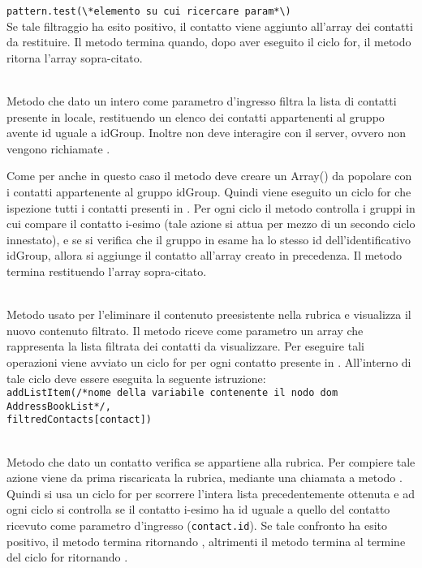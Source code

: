 \begin{description}
\verb|pattern.test(\*elemento su cui ricercare param*\)|\\

Se tale filtraggio ha esito positivo, il contatto viene aggiunto all'array dei contatti da restituire. Il metodo termina quando, dopo aver eseguito il ciclo for, il metodo ritorna l'array sopra-citato.

\item{}\\
Metodo che dato un intero come parametro d'ingresso filtra la lista di contatti presente in locale, restituendo un elenco dei contatti appartenenti al gruppo avente id uguale a idGroup. Inoltre non deve interagire con il server, ovvero non vengono richiamate . 

Come per  anche in questo caso il metodo deve creare un Array() da popolare con i contatti appartenente al gruppo idGroup. Quindi viene eseguito un ciclo for che ispezione tutti i contatti presenti in . Per ogni ciclo il metodo controlla i gruppi in cui compare il contatto i-esimo (tale azione si attua per mezzo di un secondo ciclo innestato), e se si verifica che il gruppo in esame ha lo stesso id dell'identificativo idGroup, allora si aggiunge il contatto all'array creato in precedenza. Il metodo termina restituendo l'array sopra-citato.

\item{}\\
Metodo usato per l'eliminare il contenuto preesistente nella rubrica e visualizza il nuovo contenuto filtrato. Il metodo riceve come parametro un array che rappresenta la lista filtrata dei contatti da visualizzare. Per eseguire tali operazioni viene avviato un ciclo for per ogni contatto presente in . All'interno di tale ciclo deve essere eseguita la seguente istruzione:\\

\verb|addListItem(/*nome della variabile contenente il nodo dom AddressBookList*/,|\\
\verb|filtredContacts[contact])|\\

\item{}\\
Metodo che dato un contatto verifica se appartiene alla rubrica. Per compiere tale azione viene da prima riscaricata la rubrica, mediante una chiamata a metodo . Quindi si usa un ciclo for per scorrere l'intera lista precedentemente ottenuta e ad ogni ciclo si controlla se il contatto i-esimo ha id uguale a quello del contatto ricevuto come parametro d'ingresso (\texttt{contact.id}). Se tale confronto ha esito positivo, il metodo termina ritornando , altrimenti il metodo termina al termine del ciclo for ritornando .


\end{description}
